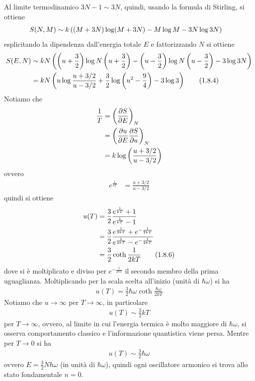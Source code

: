 \documentclass{article}
\begin{document}
Al limite termodinamico $3N - 1 \sim 3N$, quindi, usando la formula di Stirling, si ottiene 
\begin{align}
    S(N, M) &\sim k\left((M + 3N)\log(M + 3N) - M\log M - 3N\log 3N\right) \notag
\end{align}
esplicitando la dipendenza dall'energia totale $E$ e fattorizzando $N$ si ottiene 
\begin{align}
    S(E, N) &\sim kN\left(\left(u + \frac{3}{2}\right)\log N\left(u + \frac{3}{2}\right) - \left(u - \frac{3}{2}\right)\log N\left(u - \frac{3}{2}\right) - 3\log 3N\right) \notag \\
    &= kN\left(u\log \frac{u + 3/2}{u - 3/2} + \frac{3}{2}\log\left(u^2 - \frac{9}{4}\right) -3\log3\right) \tag{1.8.4}
\end{align}
Notiamo che 
\begin{align}
    \frac{1}{T} &= \left(\frac{\partial S}{\partial E}\right)_N \notag \\
    &= \left(\frac{\partial u}{\partial E}\frac{\partial S}{\partial u}\right)_N \notag \\
    &= k\log \left(\frac{u + 3/2}{u - 3/2}\right) \notag
\end{align}
ovvero 
\begin{align}
    e^{\frac{1}{kT}} &= \frac{u + 3/2}{u - 3/2} \tag{1.8.5}
\end{align}
quindi si ottiene 
\begin{align}
    u(T) &= \frac{3}{2}\frac{e^{\frac{1}{kT}} + 1}{e^{\frac{1}{kT}} - 1} \notag \\
    &= \frac{3}{2}\frac{e^{\frac{1}{2kT}} + e^{-\frac{1}{2kT}}}{e^{\frac{1}{2kT}} - e^{-\frac{1}{2kT}}} \notag \\
    &= \frac{3}{2}\coth\frac{1}{2kT} \tag{1.8.6}
\end{align}
dove si è moltiplicato e diviso per $e^{-\frac{1}{2kT}}$ il secondo membro della prima uguaglianza. Moltiplicando per la scala scelta all'inizio (unità di $\hbar\omega$) si ha 
\begin{align}
    u(T) = \frac{3}{2}\hbar\omega\coth\frac{\hbar\omega}{2kT} \tag{1.8.7}
\end{align}
Notiamo che $u \rightarrow \infty$ per $T \rightarrow \infty$, in particolare 
\begin{align}
    u(T) \sim \frac{3}{2}kT \tag{1.8.8}
\end{align}
per $T \rightarrow \infty$, ovvero, al limite in cui l'energia termica è molto maggiore di $\hbar\omega$, si osserva comportamento classico e l'informazione quantistica viene persa. Mentre per $T \rightarrow 0$ si ha 
\begin{align}
    u(T) \sim \frac{3}{2}\hbar\omega \tag{1.8.9}
\end{align}
ovvero $E = \frac{3}{2}N\hbar\omega$ (in unità di $\hbar\omega$), quindi ogni oscillatore armonico si trova allo stato fondamentale $n = 0$.
\end{document}
